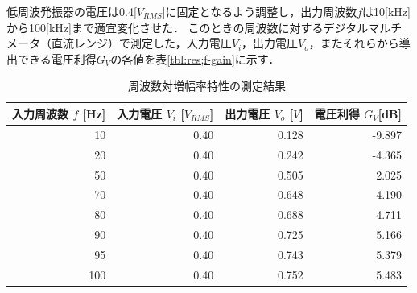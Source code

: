 \documentclass[dvipdfmx,titlepage,a4j]{jsarticle}  %
\numberwithin{equation}{section}
\begin{document}
低周波発振器の電圧は0.4[$V_{RMS}$]に固定となるよう調整し，出力周波数$f$は10[kHz]から100[kHz]まで適宜変化させた．
このときの周波数に対するデジタルマルチメータ（直流レンジ）で測定した，入力電圧$V_i$，出力電圧$V_o$，またそれらから導出できる電圧利得$G_V$の各値を表\ref{tbl:res;f-gain}に示す．

\begin{table}[H]
  \caption{周波数対増幅率特性の測定結果}
  \begin{center}
    \begin{tabular}{r|r|r|r}
      \hline
      \multicolumn{1}{l|}{入力周波数 $f$ [Hz]} & \multicolumn{1}{l|}{入力電圧 $V_i$ [$V_{RMS}$]} & \multicolumn{1}{l|}{出力電圧 $V_o$ [$V$]} & \multicolumn{1}{l}{電圧利得 $G_V$[dB]} \\ \hline\hline
      10                                       & 0.40                                            & 0.128                                     & -9.897                                 \\ \hline
      20                                       & 0.40                                            & 0.242                                     & -4.365                                 \\ \hline
      50                                       & 0.40                                            & 0.505                                     & 2.025                                  \\ \hline
      70                                       & 0.40                                            & 0.648                                     & 4.190                                  \\ \hline
      80                                       & 0.40                                            & 0.688                                     & 4.711                                  \\ \hline
      90                                       & 0.40                                            & 0.725                                     & 5.166                                  \\ \hline
      95                                       & 0.40                                            & 0.743                                     & 5.379                                  \\ \hline
      100                                      & 0.40                                            & 0.752                                     & 5.483                                  \\ \hline

\end{tabular}
\end{center}
\end{table}
\end{document}
